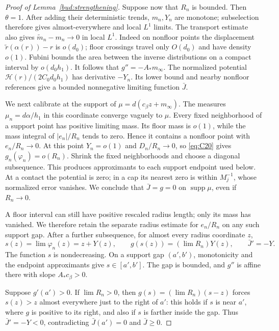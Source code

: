 \begin{proof}[Proof of Lemma~\ref{bud:strengthening}]
Suppose now that \(R_n\) is bounded. Then \(\theta=1\).
After adding their deterministic trends, \(m_n,Y_n\) are monotone;
subselection therefore gives almost-everywhere and local \(L^1\)
limits. The transport estimate also gives
\(\widetilde m_n-m_n\to0\) in local \(L^1\). Indeed on nonfloor
points the displacement \(\widetilde r(\alpha(r))-r\) is
\(o(d_0)\); floor crossings travel only \(O(d_0)\) and have
density \(o(1)\). Fubini bounds the area between the inverse
distributions on a compact interval by \(o(d_0h_1)\).
It follows that \(g''=-A_*m_\infty\).
The normalized potential
\(\mathcal H(r)/(2C_0d_0h_1)\) has derivative \(-Y_n\).
Its lower bound and nearby nonfloor references give a bounded
nonnegative limiting function \(\bar J\).

We next calibrate at the support of
\(\mu=d(c_\beta z+m_\infty)\). The measures
\(\mu_n=d\alpha/h_1\) in this coordinate converge vaguely to
\(\mu\). Every fixed neighborhood of a support point has positive
limiting mass. Its floor mass is \(o(1)\), while the mass integral
of \(|e_n|/R_n\) tends to zero. Hence it contains a nonfloor point
with \(e_n/R_n\to0\). At this point \(Y_n=o(1)\) and
\(D_n/R_n\to0\), so \eqref{eq:C20} gives
\(g_n(\varphi_n)=o(R_n)\). Shrink the fixed neighborhoods and
choose a diagonal subsequence. This produces approximants to each
support endpoint used below. At a contact the potential is zero; in a
cap its nearest zero is within \(M_j^{-1}\), whose normalized error
vanishes. We conclude that \(\bar J=g=0\) on
\(\operatorname{supp}\mu\), even if \(R_n\to0\).

A floor interval can still have positive rescaled radius length; only
its mass has vanished. We therefore retain the separate radius estimate
for \(e_n/R_n\) on any such support gap. After a further subsequence,
for almost every radius coordinate \(z\),
\[
 s(z)=\lim\varphi_n(z)=z+Y(z),\qquad
 g(s(z))=(\lim R_n)Y(z),\qquad \bar J'=-Y.
\]
The function \(s\) is nondecreasing. On a support gap \((a',b')\),
monotonicity and the endpoint approximants give \(s\in[a',b']\).
The gap is bounded, and \(g''\) is affine there with slope
\(A_*c_\beta>0\).

Suppose \(g'(a')>0\). If \(\lim R_n>0\), then
\(g(s)=(\lim R_n)(s-z)\) forces \(s(z)>z\) almost everywhere
just to the right of \(a'\): this holds if \(s\) is near
\(a'\), where \(g\) is positive to its right, and also if \(s\)
is farther inside the gap. Thus \(\bar J'=-Y<0\), contradicting
\(\bar J(a')=0\) and \(\bar J\ge0\).


\end{proof}
